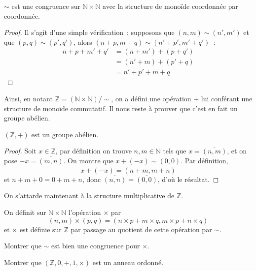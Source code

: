 \begin{proposition}
  $\sim$ est une congruence sur $\mathbb N \times \mathbb N$ avec la structure
  de monoïde coordonnée par coordonnée.
\end{proposition}

\begin{proof}
  Il s'agit d'une simple vérification~: supposons que $(n,m)\sim(n',m')$ et que
  $(p,q)\sim(p',q')$, alors $(n+p,m+q)\sim(n'+p',m'+q')$~:
  \begin{align*}
    n + p + m' + q' &= (n + m') + (p + q')\\
    &= (n' + m) + (p' + q)\\
    &= n' + p' + m + q
  \end{align*}
\end{proof}

Ainsi, en notant $\mathbb Z = (\mathbb N \times \mathbb N) / \sim$, on a
défini une opération $+$ lui conférant une structure de monoïde commutatif. Il
nous reste à prouver que c'est en fait un groupe abélien.

\begin{proposition}
  $(\mathbb Z,+)$ est un groupe abélien.
\end{proposition}

\begin{proof}
  Soit $x \in \mathbb Z$, par définition on trouve $n,m\in\mathbb N$ tels que
  $x = \overline{(n,m)}$, et on pose $-x = \overline{(m,n)}$. On montre que
  $x + (-x) \sim (0,0)$. Par définition,
  \[x + (-x) = \overline{(n + m, m + n)}\]
  et $n + m + 0 = 0 + m + n$, donc $\overline{(n,n)}=\overline{(0,0)}$, d'où le
  résultat.
\end{proof}

On s'attarde maintenant à la structure multiplicative de $\mathbb Z$.

\begin{definition}
  On définit sur $\mathbb N\times \mathbb N$ l'opération $\times$ par
  \[(n,m)\times(p,q) = (n\times p + m \times q, m \times p + n \times q)\]
  et $\times$ est définie sur $\mathbb Z$ par passage au quotient de cette
  opération par $\sim$.
\end{definition}

\begin{exercise}
  Montrer que $\sim$ est bien une congruence pour $\times$.
\end{exercise}

\begin{exercise}
  Montrer que $(\mathbb Z,0,+,1,\times)$ est un anneau ordonné.
\end{exercise}

